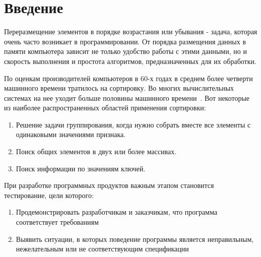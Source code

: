 \section{Введение}
Переразмещение элементов в порядке возрастания или убывания - задача, которая 
очень часто возникает в программировании. От порядка размещения данных в памяти
компьютера зависит не только удобство работы с этими данными, но и скорость выполнения
и простота алгоритмов, предназначенных для их обработки.\par
По оценкам производителей компьютеров в 60-х годах в среднем более четверти машинного времени
тратилось на сортировку. Во многих вычислительных системах на нее уходит больше половины
машинного времени~\cite{Knuth3}. Вот некоторые из наиболее распространенных областей
применения сортировки:
\begin{enumerate}
    \item Решение задачи группирования, когда нужно собрать вместе все элементы с одинаковыми значениями признака. 
    \item Поиск общих элементов в двух или более массивах. 
    \item Поиск информации по значениям ключей.
\end{enumerate}\par
При разработке программных продуктов важным этапом становится тестирование, цели которого\cite{testing:website}:
\begin{enumerate}
    \item Продемонстрировать разработчикам и заказчикам, что программа соответствует требованиям
    \item Выявить ситуации, в которых поведение программы является неправильным, нежелательным или не соответствующим спецификации
\end{enumerate}

